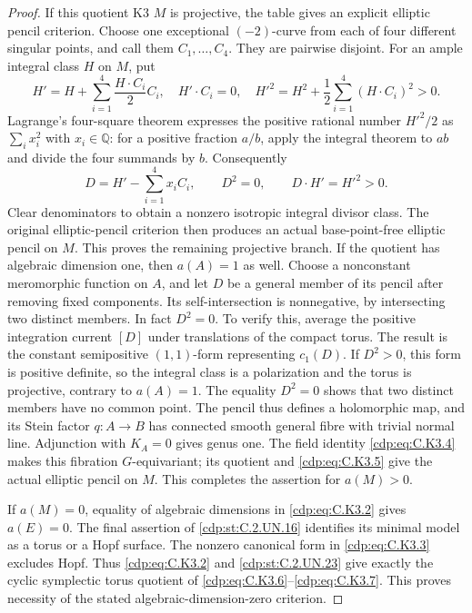 \begin{proof}
If this quotient K3 $M$ is projective, the table gives
an explicit elliptic pencil criterion. Choose one
exceptional $(-2)$-curve from each of four different
singular points, and call them $C_1,\ldots,C_4$.
They are pairwise disjoint. For an ample integral
class $H$ on $M$, put
\[
 H'=H+\sum_{i=1}^4\frac{H\cdot C_i}{2}C_i,
 \quad H'\cdot C_i=0,
 \quad H'^2=H^2+\frac12\sum_{i=1}^4(H\cdot C_i)^2>0.
                                                               \tag{C.K3.8}\label{cdp:eq:C.K3.8}
\]
Lagrange's four-square theorem
\cite[Theorem~II, Corollary~II]{Lagrange1770}
expresses the positive rational number $H'^2/2$ as
$\sum_i x_i^2$ with $x_i\in\mathbb Q$: for a
positive fraction $a/b$, apply the integral theorem
to $ab$ and divide the four summands by $b$.
Consequently
\[
 D=H'-\sum_{i=1}^4x_iC_i,
 \qquad D^2=0,
 \qquad D\cdot H'=H'^2>0.
                                                               \tag{C.K3.9}\label{cdp:eq:C.K3.9}
\]
Clear denominators to obtain a nonzero isotropic
integral divisor class. The original elliptic-pencil
criterion \cite[\S3, Corollary~3, with the reflection
argument of \S6]{PiatetskiShapiroShafarevich1971}
then produces an actual base-point-free elliptic
pencil on $M$. This proves the remaining projective
branch. If the quotient has algebraic dimension
one, then $a(A)=1$ as well. Choose a nonconstant
meromorphic function on $A$, and let $D$ be a
general member of its pencil after removing fixed
components. Its self-intersection is nonnegative,
by intersecting two distinct members. In fact
$D^2=0$. To verify this, average the positive
integration current $[D]$ under translations of
the compact torus. The result is the constant
semipositive $(1,1)$-form representing $c_1(D)$.
If $D^2>0$, this form is positive definite, so
the integral class is a polarization and the
torus is projective, contrary to $a(A)=1$.
The equality $D^2=0$ shows that two distinct
members have no common point. The pencil thus
defines a holomorphic map, and its Stein factor
$q:A\to B$ has connected smooth general fibre
with trivial normal line. Adjunction with
$K_A=0$ gives genus one. The field identity
\eqref{cdp:eq:C.K3.4} makes this fibration $G$-equivariant;
its quotient and \eqref{cdp:eq:C.K3.5} give the actual
elliptic pencil on $M$. This completes the
assertion for $a(M)>0$.

If $a(M)=0$, equality of algebraic dimensions in
\eqref{cdp:eq:C.K3.2} gives $a(E)=0$. The final assertion of
\ref{cdp:st:C.2.UN.16} identifies its minimal model as a torus
or a Hopf surface. The nonzero canonical form
in \eqref{cdp:eq:C.K3.3} excludes Hopf. Thus \eqref{cdp:eq:C.K3.2} and
\ref{cdp:st:C.2.UN.23} give exactly the cyclic symplectic torus
quotient of \eqref{cdp:eq:C.K3.6}--\eqref{cdp:eq:C.K3.7}. This proves necessity
of the stated algebraic-dimension-zero criterion.


\end{proof}
